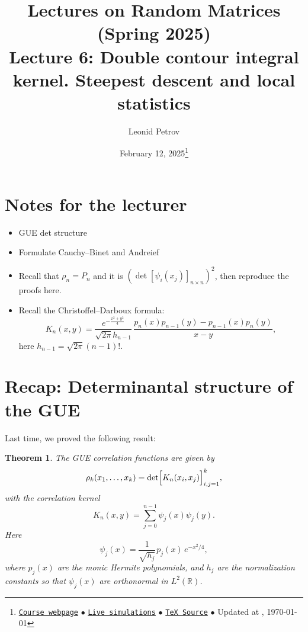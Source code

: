 \documentclass[letterpaper,11pt,oneside,reqno]{article}
\numberwithin{equation}{section}
\newcommand{\ssp}{\hspace{1pt}}
\newtheorem{theorem}[proposition]{Theorem}
\theoremstyle{definition}
\newenvironment{lnotes}{\section*{Notes for the lecturer}}{}
\begin{document}
\title{Lectures on Random Matrices
(Spring 2025)
\\Lecture 6: Double contour integral kernel. Steepest descent and local statistics}

\date{February 12, 2025\footnote{\href{https://lpetrov.cc/rmt25/}{\texttt{Course webpage}}
$\bullet$ \href{https://lpetrov.cc/simulations/model/random-matrices/}{\texttt{Live simulations}}
$\bullet$ \href{https://lpetrov.cc/rmt25/rmt25-notes/rmt2025-l06.tex}{\texttt{TeX Source}}
$\bullet$
Updated at \currenttime, \today}}

\author{Leonid Petrov}

\maketitle

\begin{lnotes}
	
\begin{itemize}
	\item GUE det structure

	\item Formulate Cauchy--Binet and Andreief

	\item Recall that $\rho_n=P_n$ and it is
	$\left( \det[\psi_i(x_j)]_{n\times n} \right)^2$, then reproduce the proofs here.

	\item Recall the Christoffel--Darboux formula:
	\begin{equation*}
		K_n(x,y)=\frac{e^{-\frac{x^2+y^2}{4}}}{\sqrt{2\pi}
		h_{n-1}}\,\frac{p_n(x)p_{n-1}(y)-p_{n-1}(x)p_n(y)}{x-y},
	\end{equation*}
	here $h_{n-1}=\sqrt{2\pi}(n-1)!$.
\end{itemize}

\end{lnotes}

\section{Recap: Determinantal structure of the GUE}

Last time, we proved the following result:
\begin{theorem}
\label{thm:determinantal_GUE}
The GUE correlation functions are given by
\[
\rho_k(x_1,\dots,x_k)=\det\Bigl[K_n(x_i,x_j)\Bigr]_{i,j=1}^k,
\]
with the correlation kernel
\[
K_n(x,y)=\sum_{j=0}^{n-1}\psi_j(x)\psi_j(y).
\]
Here
\begin{equation*}
	\psi_j(x)=\frac{1}{\sqrt{h_j}}\ssp p_j(x)\,e^{-x^2/4},
\end{equation*}
where \(p_j(x)\) are the monic Hermite polynomials, and \(h_j\) are the normalization constants so that
$\psi_j(x)$ are orthonormal in $L^2(\mathbb{R})$.
\end{theorem}
\end{document}
